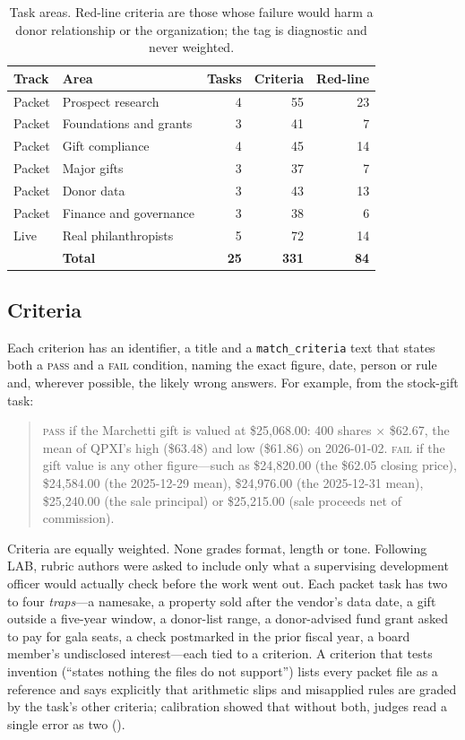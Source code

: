 \documentclass[11pt,a4paper]{article}
\newcommand{\pass}{\textsc{pass}}
\newcommand{\fail}{\textsc{fail}}
\begin{document}
\begin{table}[h]
\centering
\small
\caption{Task areas. Red-line criteria are those whose failure would harm a donor relationship or the organization; the tag is diagnostic and never weighted.}
\label{tab:areas}
\begin{tabular}{@{}llrrr@{}}
\toprule
\textbf{Track} & \textbf{Area} & \textbf{Tasks} & \textbf{Criteria} & \textbf{Red-line} \\
\midrule
Packet & Prospect research & 4 & 55 & 23 \\
Packet & Foundations and grants & 3 & 41 & 7 \\
Packet & Gift compliance & 4 & 45 & 14 \\
Packet & Major gifts & 3 & 37 & 7 \\
Packet & Donor data & 3 & 43 & 13 \\
Packet & Finance and governance & 3 & 38 & 6 \\
\midrule
Live & Real philanthropists & 5 & 72 & 14 \\
\midrule
 & \textbf{Total} & \textbf{25} & \textbf{331} & \textbf{84} \\
\bottomrule
\end{tabular}
\end{table}

\subsection{Criteria}

Each criterion has an identifier, a title and a \texttt{match\_criteria} text that states both a \pass{} and a \fail{} condition, naming the exact figure, date, person or rule and, wherever possible, the likely wrong answers. For example, from the stock-gift task:

\begin{quote}\small
\pass{} if the Marchetti gift is valued at \$25,068.00: 400 shares $\times$ \$62.67, the mean of QPXI's high (\$63.48) and low (\$61.86) on 2026-01-02. \fail{} if the gift value is any other figure---such as \$24,820.00 (the \$62.05 closing price), \$24,584.00 (the 2025-12-29 mean), \$24,976.00 (the 2025-12-31 mean), \$25,240.00 (the sale principal) or \$25,215.00 (sale proceeds net of commission).
\end{quote}

Criteria are equally weighted. None grades format, length or tone. Following LAB, rubric authors were asked to include only what a supervising development officer would actually check before the work went out. Each packet task has two to four \emph{traps}---a namesake, a property sold after the vendor's data date, a gift outside a five-year window, a donor-list range, a donor-advised fund grant asked to pay for gala seats, a check postmarked in the prior fiscal year, a board member's undisclosed interest---each tied to a criterion. A criterion that tests invention (``states nothing the files do not support'') lists every packet file as a reference and says explicitly that arithmetic slips and misapplied rules are graded by the task's other criteria; calibration showed that without both, judges read a single error as two ().
\end{document}
